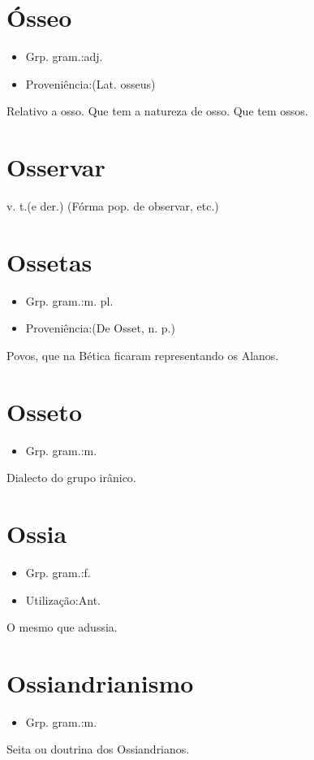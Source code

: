 \section{Ósseo}
\begin{itemize}
\item {Grp. gram.:adj.}
\end{itemize}
\begin{itemize}
\item {Proveniência:(Lat. \textunderscore osseus\textunderscore )}
\end{itemize}
Relativo a osso.
Que tem a natureza de osso.
Que tem ossos.
\section{Osservar}
\textunderscore v. t.\textunderscore  (e der.)
(Fórma pop. de \textunderscore observar\textunderscore , etc.)
\section{Ossetas}
\begin{itemize}
\item {Grp. gram.:m. pl.}
\end{itemize}
\begin{itemize}
\item {Proveniência:(De \textunderscore Osset\textunderscore , n. p.)}
\end{itemize}
Povos, que na Bética ficaram representando os Alanos.
\section{Osseto}
\begin{itemize}
\item {Grp. gram.:m.}
\end{itemize}
Dialecto do grupo irânico.
\section{Ossia}
\begin{itemize}
\item {Grp. gram.:f.}
\end{itemize}
\begin{itemize}
\item {Utilização:Ant.}
\end{itemize}
O mesmo que \textunderscore adussia\textunderscore .
\section{Ossiandrianismo}
\begin{itemize}
\item {Grp. gram.:m.}
\end{itemize}
Seita ou doutrina dos Ossiandrianos.
